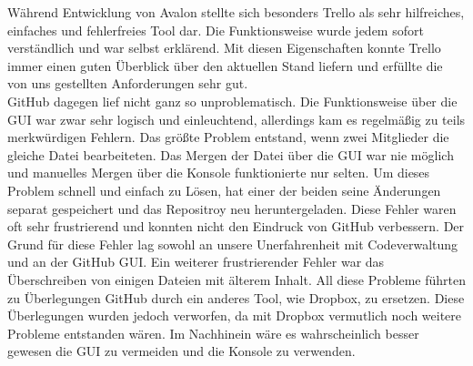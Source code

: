 Während Entwicklung von Avalon stellte sich besonders Trello als sehr hilfreiches, einfaches und fehlerfreies Tool dar. Die Funktionsweise wurde jedem sofort verständlich und war selbst erklärend. Mit diesen Eigenschaften konnte Trello immer einen guten Überblick über den aktuellen Stand liefern und erfüllte die von uns gestellten Anforderungen sehr gut.\\
GitHub dagegen lief nicht ganz so unproblematisch. Die Funktionsweise über die GUI war zwar sehr logisch und einleuchtend, allerdings kam es regelmäßig zu teils merkwürdigen Fehlern. Das größte Problem entstand, wenn zwei Mitglieder die gleiche Datei bearbeiteten. Das Mergen der Datei über die GUI war nie möglich und manuelles Mergen über die Konsole funktionierte nur selten. Um dieses Problem schnell und einfach zu Lösen, hat einer der beiden seine Änderungen separat gespeichert und das Repositroy neu heruntergeladen. Diese Fehler waren oft sehr frustrierend und konnten nicht den Eindruck von GitHub verbessern. Der Grund für diese Fehler lag sowohl an unsere Unerfahrenheit mit Codeverwaltung und an der GitHub GUI. Ein weiterer frustrierender Fehler war das Überschreiben von einigen Dateien mit älterem Inhalt. All diese Probleme führten zu Überlegungen GitHub durch ein anderes Tool, wie Dropbox, zu ersetzen. Diese Überlegungen wurden jedoch verworfen, da mit Dropbox vermutlich noch weitere Probleme entstanden wären. Im Nachhinein wäre es wahrscheinlich besser gewesen die GUI zu vermeiden und die Konsole zu verwenden.




